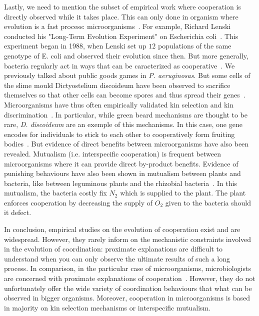     Lastly, we need to mention the subset of empirical work where cooperation is directly observed while it takes place. This can only done in organism where evolution is a fast process: microorganisms~\parencite{Elena2003}. For example, Richard Lenski conducted his "Long-Term Evolution Experiment" on Escherichia coli~\parencite{Fox2015}. This experiment began in 1988, when Lenski set up $12$ populations of the same genotype of E. coli and observed their evolution since then. But more generally, bacteria regularly act in ways that can be caracterized as cooperative~\parencite{West2006}. We previously talked about public goods games in \emph{P. aeruginosas}. But some cells of the slime mould Dictyostelium discoideum have been observed to sacrifice themselves so that other cells can become spores and thus spread their genes~\parencite{Strassmann2000}. Microorganisms have thus often empirically validated kin selection and kin discrimination~\parencite{West2006}. In particular, while green beard mechanisms are thought to be rare, \emph{D. discoideum} are an exemple of this mechanisms. In this case, one gene encodes for individuals to stick to each other to cooperatively form fruiting bodies~\parencite{Queller2003}. But evidence of direct benefits between microorganisms have also been revealed. Mutualism (i.e. interspecific cooperation) is frequent between microorganisms where it can provide direct by-product benefits. Evidence of punishing behaviours have also been shown in mutualism between plants and bacteria, like between leguminous plants and the rhizobial bacteria~\parencite{Kiers2003}. In this mutualism, the bacteria costly fix $N_{2}$ which is supplied to the plant. The plant enforces cooperation by decreasing the supply of $O_{2}$ given to the bacteria should it defect. 


    In conclusion, empirical studies on the evolution of cooperation exist and are widespread. However, they rarely inform on the mechanistic constraints involved in the evolution of coordination: proximate explanations are difficult to understand when you can only observe the ultimate results of such a long process. In comparison, in the particular case of microorganisms, microbiologists are concerned with proximate explanations of cooperation~\parencite{West2006}. However, they do not unfortunately offer the wide variety of coordination behaviours that what can be observed in bigger organisms. Moreover, cooperation in microorganisms is based in majority on kin selection mechanisms or interspecific mutualism.

